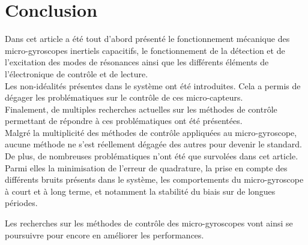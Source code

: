 \chapter*{Conclusion}
\label{sec:conclusion}

Dans cet article a été tout d'abord présenté le fonctionnement mécanique des micro-gyroscopes inertiels capacitifs, le fonctionnement de la détection et de l'excitation des modes de résonances ainsi que les différents éléments de l'électronique de contrôle et de lecture.\\

Les non-idéalités présentes dans le système ont été introduites. Cela a permis de dégager les problématiques sur le contrôle de ces micro-capteurs.\\

Finalement, de multiples recherches actuelles sur les méthodes de contrôle permettant de répondre à ces problématiques ont été présentées.\\

Malgré la multiplicité des méthodes de contrôle appliquées au micro-gyroscope, aucune méthode ne s'est réellement dégagée des autres pour devenir le standard. De plus, de nombreuses problématiques n'ont été que survolées dans cet article. Parmi elles la minimisation de l'erreur de quadrature, la prise en compte des différents bruits présents dans le système, les comportements du micro-gyroscope à court et à long terme, et notamment la stabilité du biais sur de longues périodes.

Les recherches sur les méthodes de contrôle des micro-gyroscopes vont ainsi se poursuivre pour encore en améliorer les performances.
